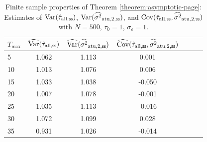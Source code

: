 \begin{table}[h!]
    \centering
{\footnotesize
\begin{tabular}{l|cccccc}
\toprule
  $T_{\max}$ &  $\widehat{\mathrm{Var}}(\hat{\tau}_{\mathrm{all},{\mathsf{ss}}})$ & $\widehat{\mathrm{Var}}(\widehat{\sigma^2}_{\mathrm{atu},2,{\mathsf{ss}}})$ & $\widehat{\mathrm{Cov}}(\hat{\tau}_{\mathrm{all},{\mathsf{ss}}}, \widehat{\sigma^2}_{\mathrm{atu},2,{\mathsf{ss}}})$   \\
\midrule
5 &  1.062 &  1.113 &  0.001 \\
10 &  1.013 &  1.076 &  0.006 \\
15 &  1.033 &  1.038 & -0.050 \\
20 &  1.007 &  1.078 & -0.001 \\
25 &  1.035 &  1.113 & -0.016 \\
30 &  1.072 &  1.099 &  0.028 \\
35 &  0.931 &  1.026 & -0.014 \\
\bottomrule
\end{tabular}
}
    \caption{Finite sample properties of Theorem  \ref{theorem:asymptotic-page}: Estimates of $\mathrm{Var}(\hat{\tau}_{\mathrm{all},{\mathsf{ss}}})$, $\mathrm{Var}(\widehat{\sigma^2}_{\mathrm{atu},2,{\mathsf{ss}}})$, and $\textnormal{Cov}(\hat{\tau}_{\mathrm{all},{\mathsf{ss}}}, \widehat{\sigma^2}_{\mathrm{atu},2,{\mathsf{ss}}})$ with $N = 500$, $\tau_0 = 1$, $\sigma_\varepsilon=1$.}
    \label{tab:theorem-asymptotic-covariance}
\end{table}